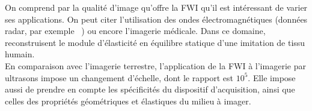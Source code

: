 On comprend par la qualité d'image qu'offre la FWI qu'il est intéressant de varier ses applications. On peut citer l'utilisation des ondes électromagnétiques (données radar, par exemple ~\cite{lopes}) ou encore l'imagerie médicale. Dans ce domaine, \cite{oberai_03,oberai_04} reconstruisent le module d'élasticité en équilibre statique d'une imitation de tissu humain.\\

En comparaison avec l'imagerie terrestre, l'application de la FWI à l'imagerie par ultrasons impose un changement d'échelle, dont le rapport est $10^5$. Elle impose aussi de prendre en compte les spécificités du dispositif d'acquisition, ainsi que celles des propriétés géométriques et élastiques du milieu à imager.







%








%
%
%
